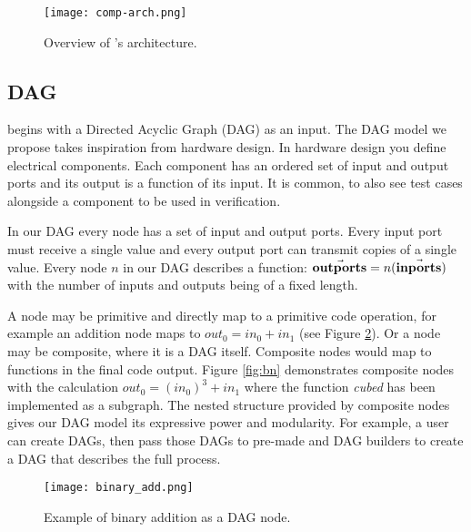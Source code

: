 \begin{figure}[h!]
    \begin{center}
        \texttt{[image: comp-arch.png]}
        \caption{Overview of \phlat{}'s architecture.}
        \label{fig:arch}
    \end{center}
\end{figure}



\subsection{DAG} \label{sec:DAG}

\phlat begins with a Directed Acyclic Graph (DAG) as an input.
The DAG model we propose takes inspiration from hardware design.
In hardware design you define electrical components.
Each component has an ordered set of input and output ports and its output is a function of its input.
It is common, to also see test cases alongside a component to be used in verification.

In our DAG every node has a set of input and output ports.
Every input port must receive a single value and every output port can transmit copies of a single value.
Every node $n$ in our DAG describes a function: $\vec{\mathbf{out ports}}=n(\vec{\mathbf{in ports}})$ with the number of inputs and outputs being of a fixed length.

A node may be primitive and directly map to a primitive code operation, for example an addition node maps to $out_0 = in_0 + in_1$ (see Figure \ref{fig:bin_add}).
Or a node may be composite, where it is a DAG itself.
Composite nodes would map to functions in the final code output.
Figure \ref{fig:bn} demonstrates composite nodes with the calculation $out_0 = (in_0)^3 + in_1$ where the function \textit{cubed} has been implemented as a subgraph.
The nested structure provided by composite nodes gives our DAG model its expressive power and modularity.
For example, a user can create  DAGs, then pass those DAGs to pre-made  and  DAG builders to create a DAG that describes the full  process.


\begin{figure}[h!]
    \begin{center}
        \texttt{[image: binary\_add.png]}
        \caption{Example of binary addition as a DAG node.}
        \label{fig:bin_add}
    \end{center}
\end{figure}


